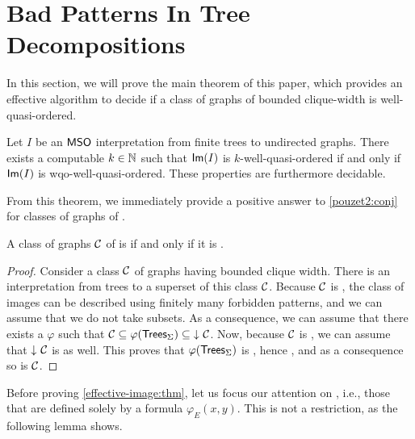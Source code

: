 \section{Bad Patterns In Tree Decompositions}
\label{sec:bad-patterns}

In this section, we will prove the main theorem of this paper, which provides
an effective algorithm to decide if a class of graphs of bounded clique-width
is well-quasi-ordered. 

\begin{theorem}[restate=effective-image:thm,label={effective-image:thm}]
    \label{effective-image:thm}
    Let $I$ be an $\mathsf{MSO}$ interpretation
    from finite trees to undirected graphs.
    There exists a computable $k \in \mathbb{N}$
    such that $\mathsf{Im}(I)$
    is $k$-well-quasi-ordered
    if and only if 
    $\mathsf{Im}(I)$ is wqo-well-quasi-ordered.
    These properties are furthermore decidable.
\end{theorem}

From this theorem, we immediately provide a positive answer to
\cref{pouzet2:conj} for classes of graphs of .

\begin{corollary}
    \label{effective-image:cor}
    A class of graphs $\mathcal{C}$ of  
    is 
    if and only if it is .
\end{corollary}
\begin{proof}
    Consider a class $\mathcal{C}$ of graphs having bounded clique width.
    There is an interpretation from trees to a superset of this class $\mathcal{C}$.
    Because $\mathcal{C}$ is , the class of images
    can be described using finitely many forbidden patterns,
    and we can assume that we do not take subsets.
    As a consequence, we can assume that there exists a $\varphi$
    such that $\Cls \subseteq \varphi(\Trees{\Sigma}) \subseteq \dwset{\Cls}$.
    Now, because $\mathcal{C}$ is , we can assume that
    $\dwset{\Cls}$ is  as well.
    This proves that $\varphi(\mathsf{Trees}_{\Sigma})$ is ,
    hence ,
    and as a consequence so is $\mathcal{C}$.
\end{proof}

Before proving \cref{effective-image:thm}, let us focus our attention on
, i.e., those that are defined solely by a
formula $\varphi_E(x,y)$.
This is not a restriction, as the following lemma
shows.

